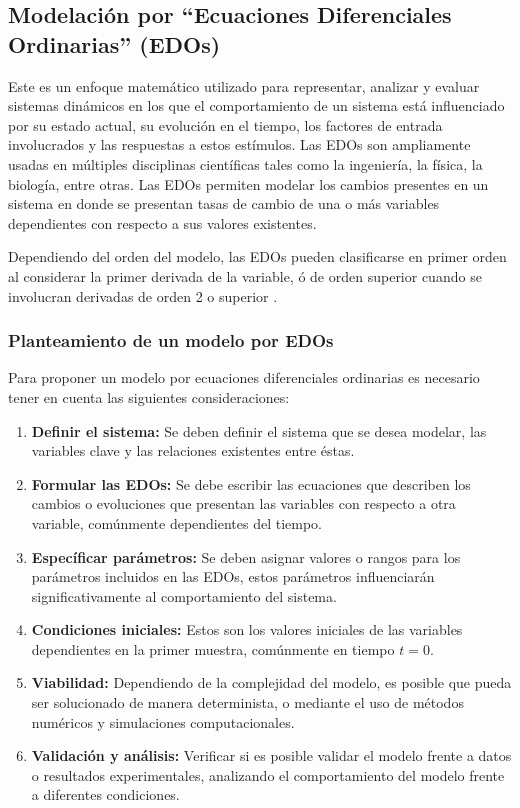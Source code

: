 \subsection{Modelación por ``Ecuaciones Diferenciales Ordinarias'' (EDOs)}\label{EDOlabel}
Este es un enfoque matemático utilizado para representar, analizar y evaluar sistemas dinámicos en los que el comportamiento de un sistema está influenciado por su estado actual, su evolución en el tiempo, los factores de entrada involucrados y las respuestas a estos estímulos. Las EDOs son ampliamente usadas en múltiples disciplinas científicas tales como la ingeniería, la física, la biología, entre otras. Las EDOs permiten modelar los cambios presentes en un sistema en donde se presentan tasas de cambio de una o más variables dependientes con respecto a sus valores existentes.

Dependiendo del orden del modelo, las EDOs pueden clasificarse en primer orden al considerar la primer derivada de la variable, ó de orden superior cuando se involucran derivadas de orden 2 o superior \cite{mathmod1D}. \pagebreak


\subsubsection{Planteamiento de un modelo por EDOs}

Para proponer un modelo por ecuaciones diferenciales ordinarias es necesario tener en cuenta las siguientes consideraciones:
\begin{enumerate}
    \item \textbf{Definir el sistema:} Se deben definir el sistema que se desea modelar, las variables clave y las relaciones existentes entre éstas.
    \item \textbf{Formular las EDOs:} Se debe escribir las ecuaciones que describen los cambios o evoluciones que presentan las variables con respecto a otra variable, comúnmente dependientes del tiempo.
    \item \textbf{Específicar parámetros:} Se deben asignar valores o rangos para los parámetros incluidos en las EDOs, estos parámetros influenciarán significativamente al comportamiento del sistema.
    \item \textbf{Condiciones iniciales:} Estos son los valores iniciales de las variables dependientes en la primer muestra, comúnmente en tiempo $t=0$.
    \item \textbf{Viabilidad:} Dependiendo de la complejidad del modelo, es posible que pueda ser solucionado de manera determinista, o mediante el uso de métodos numéricos y simulaciones computacionales.
    \item \textbf{Validación y análisis:} Verificar si es posible validar el modelo frente a datos o resultados experimentales, analizando el comportamiento del modelo frente a diferentes condiciones.

\end{enumerate}

